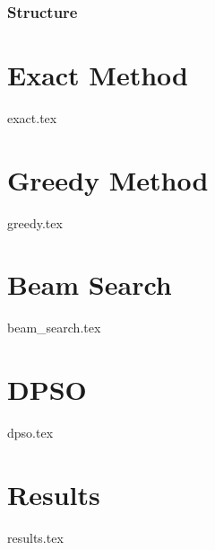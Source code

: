 \documentclass{beamer}
\begin{document}
    \begin{frame}
        \titlepage
    \end{frame}
    \begin{frame}
        \frametitle{Structure}
        \tableofcontents
    \end{frame}

    \section{Exact Method}
    {exact.tex}

    \section{Greedy Method}
    {greedy.tex}

    \section{Beam Search}
    {beam_search.tex}

    \section{DPSO}
    {dpso.tex}

    \section{Results}
    {results.tex}

     
    
\end{document}
